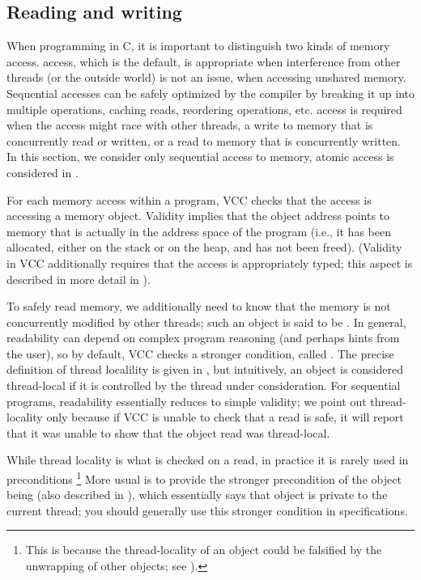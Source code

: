 \subsection{Reading and writing}
\label{sect:writes}
When programming in C, it is important to distinguish two kinds of
memory access.  access, which is the default, is appropriate when
interference from other threads (or the outside world) is not an
issue, \eg when accessing unshared memory. Sequential accesses can be
safely optimized by the compiler by breaking it up into multiple
operations, caching reads, reordering operations, etc. 
 access is required when the access might race with other
threads, \eg a write to memory that is concurrently read or written,
or a read to memory that is concurrently written. In this section, we
consider only sequential access to memory, atomic access is considered
in . 

For each memory access within a program, VCC checks that the access is accessing a 
 memory object. Validity implies that the object address
points to memory that is actually in the address space of the program
(i.e., it has been allocated, either on the stack or on the heap, and
has not been freed). (Validity in VCC additionally requires that the
access is appropriately typed; this aspect is 
described in more detail in ). 

To safely read memory, we additionally need to know that the memory
is not concurrently modified by other threads; such an object is said
to be . In general, readability can depend on complex
program reasoning (and perhaps hints from the user), so by default,
VCC checks a stronger condition, called . The precise definition of thread localility is given in 
, but intuitively, an object is
considered thread-local if it is controlled by the thread under
consideration. For sequential programs, readability essentially
reduces to simple validity; we point out thread-locality only because
if VCC is unable to check that a read is safe, it will report that it
was unable to show that the object read was thread-local.

While thread locality is what is checked on a read, in practice it is
rarely used in preconditions%
\footnote{This is because the thread-locality of an object could be
  falsified by the unwrapping of other objects; see
  ).}  More usual is to provide the stronger
precondition of the object being \vcc{\mutable} (also described in
), which essentially says that object is
private to the current thread; you should generally use this stronger
condition in specifications.


